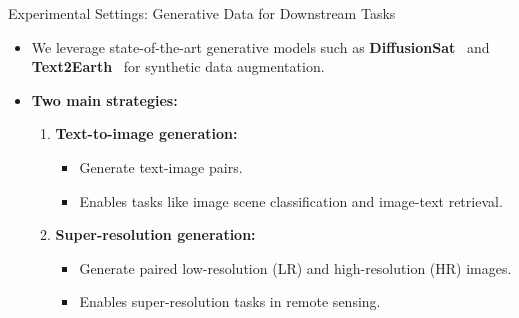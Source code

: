   \begin{refsection}
    \begin{frame}{Experimental Settings: Generative Data for Downstream Tasks}
      \begin{itemize}
        \item We leverage state-of-the-art generative models such as \textbf{DiffusionSat}~\parencite{diffusionset2024} and \textbf{Text2Earth}~\parencite{text2earth2025} for synthetic data augmentation.
        \item \textbf{Two main strategies:}
        \begin{enumerate}
          \item \textbf{Text-to-image generation:}
            \begin{itemize}
              \item Generate text-image pairs.
              \item Enables tasks like image scene classification and image-text retrieval.
            \end{itemize}
          \item \textbf{Super-resolution generation:}
            \begin{itemize}
              \item Generate paired low-resolution (LR) and high-resolution (HR) images.
              \item Enables super-resolution tasks in remote sensing.
            \end{itemize}
        \end{enumerate}
      \end{itemize}
      \vspace{1em}
      \bottomleftrefs
    \end{frame}
    \end{refsection}


